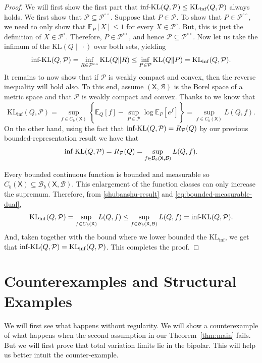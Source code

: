 \documentclass[11pt]{article}
\newcommand{\KL}{\mathrm{KL}}
\newcommand{\KLinf}{\mathrm{KL}_{\mathrm{inf}}}
\newcommand{\infKL}{\textnormal{inf-KL}}
\newcommand{\E}{\mathbb{E}}
\newcommand{\Pcal}{\mathcal{P}}
\newcommand{\X}{\mathsf{X}}
\newcommand{\B}{\mathcal{B}}
\theoremstyle{definition}
\theoremstyle{definition}
\begin{document}
\begin{proof}
We will first show the first part that $\infKL(Q, \mathcal P)\le \KLinf(Q,\mathcal P)$ always holds. We first show that $\Pcal\subseteq\Pcal^{\circ\circ}$. Suppose that $P\in\mathcal P$. To show that $P\in\Pcal^{\circ\circ}$, we need to only show that $\E_P[X]\le 1$ for every $X\in\Pcal^{\circ}$. But, this is just the definition of $X\in\Pcal^{\circ}$. Therefore, $P\in\Pcal^{\circ\circ}$, and hence $\Pcal\subseteq\Pcal^{\circ\circ}$. Now let us take the infimum of the $\KL(Q\|\cdot)$ over both sets, yielding 
\[
\infKL(Q,\Pcal) = \inf_{R\in\Pcal^{\circ\circ}}\KL(Q\|R)\le \inf_{P\in\Pcal}\KL(Q\|P) = \KLinf(Q,\mathcal P).
\]
It remains to now show that if $\Pcal$ is weakly compact and convex, then the reverse inequality will hold also. To this end, assume $(\X,\B)$ is the Borel space of a metric space and that $\Pcal$ is weakly compact and convex. Thanks to \parencite{shekhar2025optimalanytimevalidtestscomposite} we know that
\begin{equation}\label{shubanshu-result}
\KLinf(Q,\Pcal)=\sup_{f\in C_b(\X)}\left\{\E_Q[f]-\sup_{P\in\Pcal}\log \E_P[e^f]\right\} = \sup_{f\in C_b(\X)}L(Q,f).
\end{equation}
On the other hand, using the fact that $\infKL(Q,\Pcal)=R_{\Pcal}(Q)$ by our previous bounded-representation result we have that
\begin{equation}\label{eq:bounded-measurable-dual}
\infKL(Q,\Pcal)=R_{\Pcal}(Q)=\sup_{f\in\mathcal B_b(\X,\B)}L(Q,f).
\end{equation}

Every bounded continuous function is bounded and measurable so $C_b(\X)\subseteq\mathcal B_b(\X,\B)$. This enlargement of the function classes can only increase the supremum. Therefore, from \eqref{shubanshu-result} and \eqref{eq:bounded-measurable-dual},
\[
\KLinf(Q,\Pcal)=\sup_{f\in C_b(\X)}L(Q,f)\le \sup_{f\in \mathcal B_b(\X,\B)}L(Q,f)=\infKL(Q,\Pcal).
\]
And, taken together with the bound where we lower bounded the $\KLinf$, we get that $\infKL(Q,\Pcal)=\KLinf(Q,\Pcal)$. This completes the proof.
\end{proof}

\section{Counterexamples and Structural Examples}\label{sec:counterx}
We will first see what happens without regularity. We will show a counterexample of what happens when the second assumption in our Theorem~\ref{thm:main} fails. But we will first prove that total variation limits lie in the bipolar. This will help us better intuit the counter-example.
\end{document}
